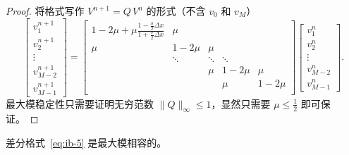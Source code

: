 \begin{proof}
    将格式写作 $V^{n+1} = Q\, V^n$ 的形式（不含 $v_0$ 和 $v_{M}$）
    \[
        \begin{bmatrix}
            v_1^{n+1} \\ v_2^{n+1} \\ \vdots \\ v_{M-2}^{n+1} \\ v_{M-1}^{n+1}
        \end{bmatrix}
        =
        \begin{bmatrix}
            1-2\mu + \mu\frac{1-\frac{\sigma}2 \Delta x}{1 + \frac{\sigma}2 \Delta x} & \mu    &        &        &        \\
            \mu                                                                       & 1-2\mu & \mu    &        &        \\
                                                                                      & \ddots & \ddots & \ddots &        \\
                                                                                      &        & \mu    & 1-2\mu & \mu    \\
                                                                                      &        &        & \mu    & 1-2\mu \\
        \end{bmatrix}
        \begin{bmatrix}
            v_1^{n} \\ v_2^{n} \\ \vdots \\ v_{M-2}^{n} \\ v_{M-1}^{n}
        \end{bmatrix}.
    \]
    最大模稳定性只需要证明无穷范数 $\|Q\|_{\infty} \le 1$，显然只需要 $\mu \le \frac12$ 即可保证。
\end{proof}

\begin{example}
    差分格式~\eqref{eq:ib-5} 是最大模相容的。
\end{example}

